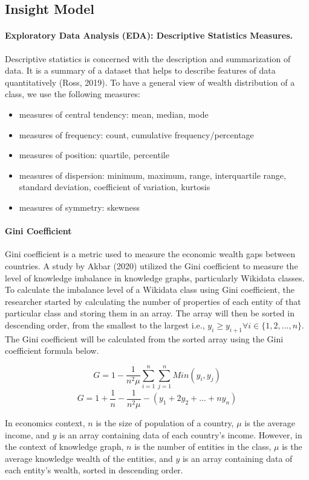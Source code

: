 \subsection{Insight Model}

\paragraph{Exploratory Data Analysis (EDA): Descriptive Statistics Measures.} Descriptive statistics is concerned with the description and summarization of data. It is a summary of a dataset that helps to describe features of data quantitatively (Ross, 2019). To have a general view of wealth distribution of a class, we use the following measures:
\begin{itemize}
  \item measures of central tendency: mean, median, mode
  \item measures of frequency: count, cumulative frequency/percentage
  \item measures of position: quartile, percentile
  \item measures of dispersion: minimum, maximum, range, interquartile range, standard deviation, coefficient of variation, kurtosis
  \item measures of symmetry: skewness
\end{itemize}


\paragraph{Gini Coefficient}
Gini coefficient is a metric used to measure the economic wealth gaps between countries. A study by Akbar (2020) utilized the Gini coefficient to measure the level of knowledge imbalance in knowledge graphs, particularly Wikidata classes. To calculate the imbalance level of a Wikidata class using Gini coefficient, the researcher started by calculating the number of properties of each entity of that particular class and storing them in an array. The array will then be sorted in descending order, from the smallest to the largest i.e., \(y_{i} \geq y_{i+1} \forall i \in \{1, 2, ..., n\}\). The Gini coefficient will be calculated from the sorted array using the Gini coefficient formula below.

\[G = 1 - \frac{1}{n^{2}\mu} \sum_{i=1}^{n} \sum_{j=1}^{n} Min(y_{i}, y_{j})\]
\[G = 1 + \frac{1}{n} - \frac{1}{n^{2}\mu} - (y_{1} + 2y_{2} + ... + ny_{n})\]

In economics context, \(n\) is the size of population of a country, $\mu$ is the average income, and \(y\) is an array containing data of each country's income. However, in the context of knowledge graph, \(n\) is the number of entities in the class, $\mu$ is the average knowledge wealth of the entities, and \(y\) is an array containing data of each entity's wealth, sorted in descending order.

